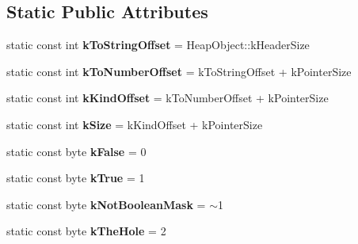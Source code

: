 \subsection*{Static Public Attributes}
\begin{DoxyCompactItemize}
\item 
\hypertarget{classv8_1_1internal_1_1_oddball_aa6a9637c9e8da1a28f83c788c1027013}{}static const int {\bfseries k\+To\+String\+Offset} = Heap\+Object\+::k\+Header\+Size\label{classv8_1_1internal_1_1_oddball_aa6a9637c9e8da1a28f83c788c1027013}

\item 
\hypertarget{classv8_1_1internal_1_1_oddball_a15f1533c8dc4c622d3a14c291103d5e3}{}static const int {\bfseries k\+To\+Number\+Offset} = k\+To\+String\+Offset + k\+Pointer\+Size\label{classv8_1_1internal_1_1_oddball_a15f1533c8dc4c622d3a14c291103d5e3}

\item 
\hypertarget{classv8_1_1internal_1_1_oddball_a3aa86ed02d356c506c27a284e683b865}{}static const int {\bfseries k\+Kind\+Offset} = k\+To\+Number\+Offset + k\+Pointer\+Size\label{classv8_1_1internal_1_1_oddball_a3aa86ed02d356c506c27a284e683b865}

\item 
\hypertarget{classv8_1_1internal_1_1_oddball_a94ef696c3fd95d44b6ace00ae799d890}{}static const int {\bfseries k\+Size} = k\+Kind\+Offset + k\+Pointer\+Size\label{classv8_1_1internal_1_1_oddball_a94ef696c3fd95d44b6ace00ae799d890}

\item 
\hypertarget{classv8_1_1internal_1_1_oddball_a3556ea40330ca7f13d1546b9a5ab278c}{}static const byte {\bfseries k\+False} = 0\label{classv8_1_1internal_1_1_oddball_a3556ea40330ca7f13d1546b9a5ab278c}

\item 
\hypertarget{classv8_1_1internal_1_1_oddball_a7dd4be392c0689925b57abb5898c8b47}{}static const byte {\bfseries k\+True} = 1\label{classv8_1_1internal_1_1_oddball_a7dd4be392c0689925b57abb5898c8b47}

\item 
\hypertarget{classv8_1_1internal_1_1_oddball_a0286390eeab3d5ff7cd0e0dd09712c1b}{}static const byte {\bfseries k\+Not\+Boolean\+Mask} = $\sim$1\label{classv8_1_1internal_1_1_oddball_a0286390eeab3d5ff7cd0e0dd09712c1b}

\item 
\hypertarget{classv8_1_1internal_1_1_oddball_a56d93ed85d040bf41eb738a1f0e0c2f2}{}static const byte {\bfseries k\+The\+Hole} = 2\label{classv8_1_1internal_1_1_oddball_a56d93ed85d040bf41eb738a1f0e0c2f2}


\end{DoxyCompactItemize}
